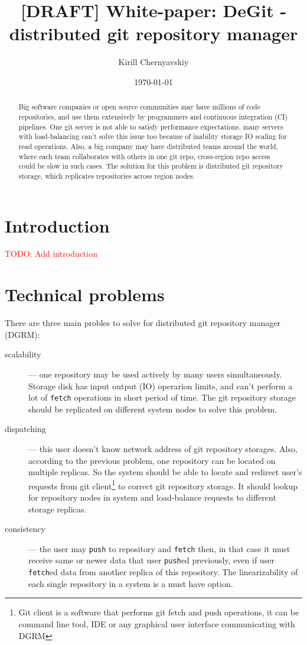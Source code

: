 \documentclass[acmlarge, screen, nonacm]{acmart}
\date{\small\today}
\title[DeGit white paper]{[DRAFT] White-paper: DeGit - distributed git repository manager}
\author{Kirill Chernyavskiy}
\newcommand{\code}[1]{\texttt{#1}}
\newcommand{\todo}[1]{\textcolor{red}{TODO: #1}}
\begin{document}
\raggedbottom

\begin{abstract}
  Big software companies or open source communities 
  may have millions of code repositories,
  and use them extensively by programmers and continuous integration (CI) pipelines.
  One git server is not able to satisfy performance expectations,
  many servers with load-balancing can't solve this issue too because
  of inability storage IO scaling for read operations.
  Also, a big company may have distributed teams around the world,
  where each team collaborates with others in one git repo,
  cross-region repo access could be slow in such cases.
  The solution for this problem is distributed git repository storage,
  which replicates repositories across region nodes.
\end{abstract}

\maketitle

\section{Introduction}

\todo{Add introduction}

\section{Technical problems}


There are three main probles to solve for distributed git repository manager (DGRM):
\begin{description}
\item[scalability] --- one repository may be used actively by many users simultaneously. Storage disk
  has input output (IO) operarion limits, and can't perform a lot of \code{fetch} operations in
  short period of time. The git repository storage should be replicated on different system nodes to
  solve this problem.
\item[dispatching] --- this user doesn't know network address of git repository storages. Also, according to the
  previous problem, one repository can be located on multiple replicas.
  So the system should be able to locate and redirect user's requests
  from git client\footnote{Git client is a software that performs git fetch and push operations, it can be
  command line tool, IDE or any graphical user interface communicating with DGRM} to correct git repository
  storage. It should lookup for repository nodes in system and load-balance requests to different storage replicas.
\item[consistency] --- the user may \code{push} to repository and \code{fetch} then, in that case it must receive
  same or newer data that user \code{push}ed previously, even if user \code{fetch}ed data from another
  replica of this repository. The linearizability of each single repository in a system is a must have option.
\end{description}
\end{document}
